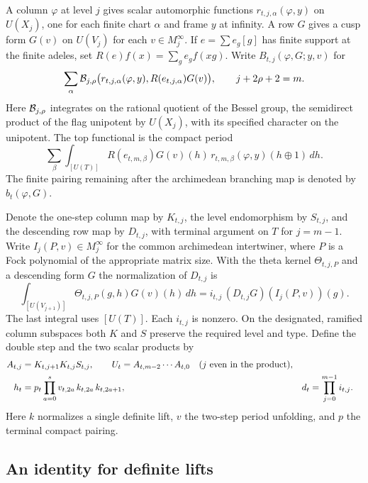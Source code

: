 A column \(\varphi\) at level \(j\) gives scalar automorphic
functions \(r_{t,j,\alpha}(\varphi,y)\) on \(U(X_j)\), one for
each finite chart \(\alpha\) and frame \(y\) at infinity. A row
\(G\) gives a cusp form \(G(v)\) on \(U(V_j)\) for each
\(v\in M_j^\infty\). If \(e=\sum e_g[g]\) has finite support at
the finite adeles, set \(R(e)f(x)=\sum_g e_g f(xg)\). Write
\(B_{t,j}(\varphi,G;y,v)\) for
\[
 \sum_\alpha {\cal B}_{j,\rho}
   \bigl(r_{t,j,\alpha}(\varphi,y),R(e_{t,j,\alpha})G(v)\bigr),
 \qquad j+2\rho+2=m .
\]
Here \({\cal B}_{j,\rho}\) integrates on the rational quotient
of the Bessel group, the semidirect product of the flag
unipotent by \(U(X_j)\), with its specified character on the
unipotent. The top functional is the compact period
\[
 \sum_\beta\int_{[U(T)]}
    R(e_{t,m,\beta})G(v)(h)\,r_{t,m,\beta}(\varphi,y)(h\oplus 1)\,dh .
\]
The finite pairing remaining after the archimedean branching map is
denoted by \(b_t(\varphi,G)\).

Denote the one-step column map by \(K_{t,j}\), the level
endomorphism by \(S_{t,j}\), and the descending row map by
\(D_{t,j}\), with terminal argument on \(T\) for \(j=m-1\).
Write \(I_j(P,v)\in M_j^\infty\) for the common archimedean
intertwiner, where \(P\) is a Fock polynomial of the appropriate
matrix size. With the theta kernel \(\Theta_{t,j,P}\) and a
descending form \(G\) the normalization of \(D_{t,j}\) is
\begin{equation}\label{eq:down-theta}
 \int_{[U(V_{j+1})]} \Theta_{t,j,P}(g,h)G(v)(h)\,dh
     = i_{t,j}\,(D_{t,j}G)(I_j(P,v))(g).
\end{equation}
The last integral uses \([U(T)]\). Each \(i_{t,j}\) is nonzero.
On the designated, ramified column subspaces both \(K\) and \(S\)
preserve the required level and type. Define the double step and
the two scalar products by
\begin{align}
 A_{t,j}&=K_{t,j+1}K_{t,j}S_{t,j}, \qquad
 U_t=A_{t,m-2}\cdots A_{t,0} \quad(j\ {\rm even}
                       \text{ in the product}),\nonumber\\
 h_t&=p_t\prod_{a=0}^s v_{t,2a}\,k_{t,2a}\,k_{t,2a+1},
 &d_t&=\prod_{j=0}^{m-1}i_{t,j}. \label{eq:top-bottom}
\end{align}
Here \(k\) normalizes a single definite lift, \(v\) the two-step
period unfolding, and \(p\) the terminal compact pairing.

\subsection{An identity for definite lifts}

